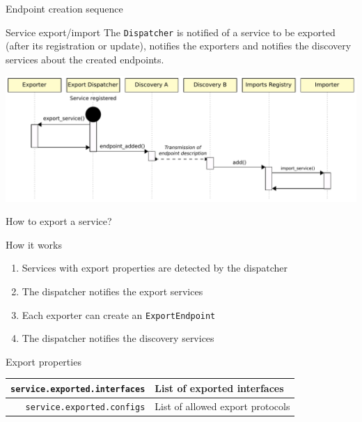 \begin{frame}{Endpoint creation sequence}
\begin{small}
\begin{block}{Service export/import}
The \texttt{Dispatcher} is notified of a service to be exported (after its registration or update), notifies the exporters and notifies the discovery services about the created endpoints.
\end{block}
\end{small}

\vspace{2ex}

\centering
\includegraphics[width=\textwidth]{../imgs/rs_sequence}
\end{frame}

\begin{frame}{How to export a service?}
\begin{block}{How it works}
\begin{enumerate}
\item Services with export properties are detected by the dispatcher
\item The dispatcher notifies the export services
\item Each exporter can create an \texttt{ExportEndpoint}
\item The dispatcher notifies the discovery services
\end{enumerate}
\end{block}

\begin{block}{Export properties}
\begin{tabular}{rl}
\texttt{\small service.exported.interfaces} & List of exported interfaces \\
\hline
\texttt{\small service.exported.configs} & List of allowed export protocols \\
\end{tabular}
\end{block}
\end{frame}

